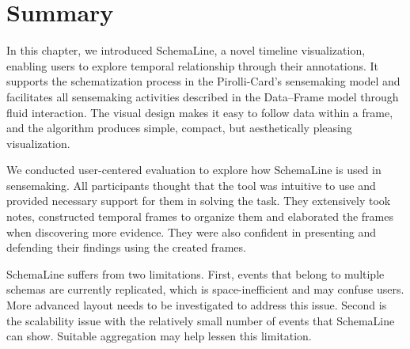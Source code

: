 \section{Summary}
In this chapter, we introduced SchemaLine, a novel timeline visualization, enabling users to explore temporal relationship through their annotations. It supports the schematization process in the Pirolli-Card's sensemaking model and facilitates all sensemaking activities described in the Data--Frame model through fluid interaction. The visual design makes it easy to follow data within a frame, and the algorithm produces simple, compact, but aesthetically pleasing visualization. 

We conducted user-centered evaluation to explore how SchemaLine is used in sensemaking. All participants thought that the tool was intuitive to use and provided necessary support for them in solving the task. They extensively took notes, constructed temporal frames to organize them and elaborated the frames when discovering more evidence. They were also confident in presenting and defending their findings using the created frames.

SchemaLine suffers from two limitations. First, events that belong to multiple schemas are currently replicated, which is space-inefficient and may confuse users. More advanced layout needs to be investigated to address this issue. Second is the scalability issue with the relatively small number of events that SchemaLine can show. Suitable aggregation may help lessen this limitation.